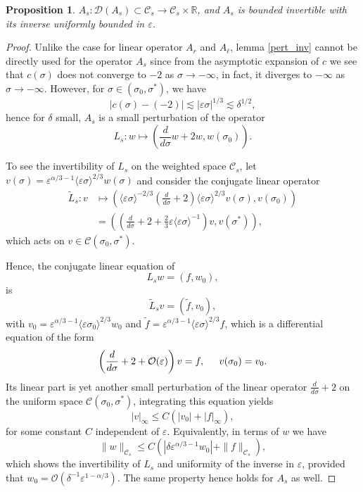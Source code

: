 \documentclass[letterpaper,11pt]{article}
\newcommand{\rmO}{\mathcal{O}}
\newcommand{\eps}{\varepsilon}
\newcommand{\lar}{ \lesssim }
\numberwithin{equation}{section}
\theoremstyle{plain}
\newtheorem{proposition}[theorem]{Proposition}
\begin{document}
\begin{proposition}\label{inv_A_s}
$A_s : \mathcal{D}(A_s) \subset \mathcal{C}_s \to \mathcal{C}_s \times \mathbb{R}$, and $A_s$ is bounded invertible with its inverse uniformly bounded in $\eps$.
\end{proposition}
\begin{proof}Unlike the case for linear operator $A_r$ and $A_\ell$, lemma \ref{pert_inv} cannot be directly used for the operator $A_s$ since from the asymptotic expansion of $c$ we see that $c(\sigma)$ does not converge to $-2$ as $\sigma \to -\infty$, in fact, it diverges to $-\infty$ as $\sigma \to -\infty$. 
However, for $\sigma \in (\sigma_0, \sigma^*)$, we have
\[
|c(\sigma) - (-2) | \lar |\eps\sigma|^{1/3} \lar \delta^{1/2},
\]
hence for $\delta$ small, $A_s$ is a small perturbation of the operator
\[
L_s : w \mapsto \left( \frac{d}{d\sigma}w+2w, w(\sigma_0)\right).
\]

To see the invertibility of $L_s$ on the weighted space $\mathcal{C}_s$, let $v(\sigma) = \eps^{\alpha/3-1}\langle \eps \sigma \rangle^{2/3}w(\sigma)$ and consider the conjugate linear operator
\begin{align*}
\tilde{L}_s: v &\mapsto \left( \langle \eps \sigma \rangle^{-2/3}\left(\frac{d}{d\sigma} + 2\right) \langle \eps \sigma \rangle^{2/3} v(\sigma), v(\sigma_0) \right)\\
&= \left( \left(\frac{d}{d\sigma}+2+\frac{2}{3}\eps\langle \eps\sigma \rangle^{-1}\right)  v, v(\sigma^*) \right),
\end{align*}
which acts on $v \in \mathcal{C}(\sigma_0, \sigma^*)$. 

Hence, the conjugate linear equation of 
\[
L_s w = (f,w_0),
\]
is 
\[
\tilde{L}_s v = (\tilde{f}, v_0),
\]
with $v_0 = \eps^{\alpha/3-1}\langle \eps \sigma_0 \rangle^{2/3} w_0$ and $\tilde{f} = \eps^{\alpha/3-1}\langle \eps \sigma \rangle^{2/3}f$, which is a differential equation of the form
\[
\left( \frac{d}{d\sigma}+2+\rmO(\eps) \right) v =f, \hspace{0.2in} v(\sigma_0) = v_0.
\]
Its linear part is yet another small perturbation of the linear operator $\frac{d}{d\sigma}+2$ on the uniform space $\mathcal{C}(\sigma_0, \sigma^*)$, integrating this equation yields
\[
|v|_\infty \le C(|v_0|+|f|_\infty),
\]
for some constant $C$ independent of $\eps$. Equivalently, in terms of $w$ we have
\[
\|w\|_{\mathcal{C}_s} \le C(|\delta \eps^{\alpha/3-1}w_0|+ \|f\|_{\mathcal{C}_s}),
\]
which shows the invertibility of $L_s$ and uniformity of the inverse in $\eps$, provided that $w_0 = \rmO(\delta^{-1} \eps^{1-\alpha/3})$. The same property hence holds for $A_s$ as well.
\end{proof}
\end{document}
